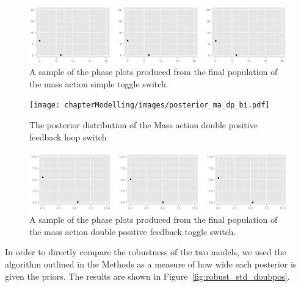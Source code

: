 \begin{figure}[p]
\centering
\includegraphics[scale=0.4]{chapterModelling/images/ma_cl_bi_phase_plot.png}
\caption{A sample of the phase plots produced from the final population of the mass action simple toggle switch.}
\label{fig:det_std_phase}
\end{figure}

\begin{figure}[p]
\centering
\texttt{[image: chapterModelling/images/posterior\_ma\_dp\_bi.pdf]}
\caption{The posterior distribution of the Mass action double positive feedback loop switch}
\label{fig:doub_pos}
\end{figure}

\begin{figure}[p]
\centering
\includegraphics[scale=0.4]{chapterModelling/images/ma_dp_bi_phase_plot.png}
\caption{A sample of the phase plots produced from the final population of the mass action double positive feedback toggle switch.}
\label{fig:det_dp_phase}
\end{figure}

In order to directly compare the robustness of the two models, we used the algorithm outlined in the Methods as a measure of how wide each posterior is given the priors. The results are shown in Figure~\ref{fig:robust_std_doubpos}. 

